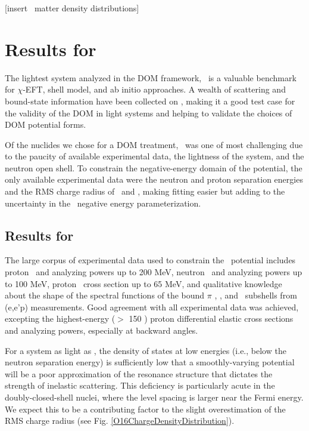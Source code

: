 [insert \caEight\ matter density distributions]

\section{Results for \oSixEight}
The lightest system analyzed in the DOM framework, \oSix\ is a valuable benchmark
for $\chi$-EFT, shell model, and ab initio approaches. A wealth of scattering and
bound-state information have been collected on \oSix, making it a good test case for the validity
of the DOM in light systems and helping to validate the choices of DOM potential forms.

Of the nuclides we chose for a DOM treatment, \oEight\ was one of most challenging due to the paucity of
available experimental data, the lightness of the system, and the neutron open shell.
To constrain the negative-energy domain
of the potential, the only available experimental data were the neutron and proton separation
energies and the RMS charge radius of \oEight\ and \neEight, making fitting easier but adding to the
uncertainty in the \oEight\ negative energy parameterization.

\subsection{Results for \oSix}
The large corpus of experimental data used to constrain the \oSix\
potential includes proton \el\ and analyzing powers up to 200 MeV, neutron \el\ and analyzing powers
up to 100 MeV, proton \rxn\ cross section up to 65 MeV, and qualitative knowledge about the shape of
the spectral functions of the bound $\pi$ \sOne, \pThree, and \pOne\ subshells from (e,e'p)
measurements. Good agreement with all 
experimental data was achieved, excepting the highest-energy ($>$ 150 \mega\electronvolt)
proton differential elastic cross sections and analyzing powers, especially at backward angles.

For a system as light as \oSix, the density of states at low energies (i.e., below the neutron
separation energy) is sufficiently low that a smoothly-varying potential will be a poor
approximation of the resonance structure that dictates the strength of inelastic scattering. This
deficiency is particularly acute in the doubly-closed-shell nuclei, where the level spacing is
larger near the Fermi energy. We expect this to be a contributing factor to the slight
overestimation of the RMS charge radius (see Fig. \ref{O16ChargeDensityDistribution}).

